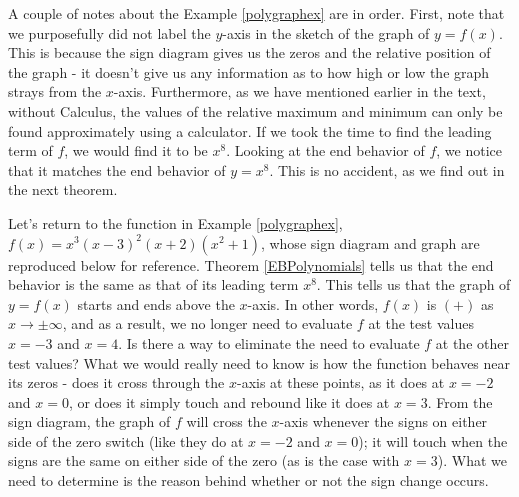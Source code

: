 \documentclass{ximera}
\begin{document}
A couple of notes about the Example \ref{polygraphex} are in order.  First, note that we purposefully did not label the $y$-axis in the sketch of the graph of $y=f(x)$.  This is because the sign diagram gives us the zeros and the relative position of the graph - it doesn't give us any information as to how high or low the graph strays from the $x$-axis.  Furthermore, as we have mentioned earlier in the text, without Calculus, the values of the relative maximum and minimum can only be found approximately using a calculator.  If we took the time to find the leading term of $f$, we would find it to be $x^8$.  Looking at the end behavior of $f$, we notice that it matches the end behavior of $y=x^8$.  This is no accident, as we find out in the next theorem.

\medskip


Let's return to the function in Example \ref{polygraphex}, $f(x) = x^3 (x-3)^2 (x+2)\left(x^2+1\right)$, whose sign diagram and graph are reproduced below for reference.  Theorem \ref{EBPolynomials} tells us that the end behavior is the same as that of its leading term $x^{8}$.  This tells us that the graph of $y=f(x)$ starts and ends above the $x$-axis.  In other words, $f(x)$ is $(+)$ as $x \rightarrow \pm \infty$, and as a result, we no longer need to evaluate $f$ at the test values $x=-3$ and $x=4$.  Is there a way to eliminate the need to evaluate $f$ at the other test values?  What we would really need to know is how the function behaves near its zeros - does it cross through the $x$-axis at these points, as it does at $x=-2$ and $x=0$, or does it simply touch and rebound like it does at $x=3$.  From the sign diagram, the graph of $f$ will cross the $x$-axis whenever the signs on either side of the zero switch (like they do at $x=-2$ and $x=0$);  it will touch when the signs are the same on either side of the zero (as is the case with $x=3$). What we need to determine is the reason behind whether or not the sign change occurs.
\end{document}
